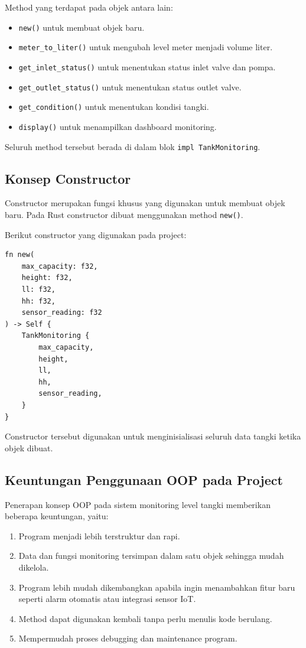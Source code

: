 \documentclass[12pt,a4paper]{article}
\begin{document}
Method yang terdapat pada objek antara lain:

\begin{itemize}
    \item \texttt{new()} untuk membuat objek baru.
    \item \texttt{meter\_to\_liter()} untuk mengubah level meter menjadi volume liter.
    \item \texttt{get\_inlet\_status()} untuk menentukan status inlet valve dan pompa.
    \item \texttt{get\_outlet\_status()} untuk menentukan status outlet valve.
    \item \texttt{get\_condition()} untuk menentukan kondisi tangki.
    \item \texttt{display()} untuk menampilkan dashboard monitoring.
\end{itemize}

Seluruh method tersebut berada di dalam blok \texttt{impl TankMonitoring}. 

\subsection{Konsep Constructor}

Constructor merupakan fungsi khusus yang digunakan untuk membuat objek baru. Pada Rust constructor dibuat menggunakan method \texttt{new()}.

Berikut constructor yang digunakan pada project:

\begin{verbatim}
fn new(
    max_capacity: f32,
    height: f32,
    ll: f32,
    hh: f32,
    sensor_reading: f32
) -> Self {
    TankMonitoring {
        max_capacity,
        height,
        ll,
        hh,
        sensor_reading,
    }
}
\end{verbatim}

Constructor tersebut digunakan untuk menginisialisasi seluruh data tangki ketika objek dibuat. 

\subsection{Keuntungan Penggunaan OOP pada Project}

Penerapan konsep OOP pada sistem monitoring level tangki memberikan beberapa keuntungan, yaitu:

\begin{enumerate}
    \item Program menjadi lebih terstruktur dan rapi.
    
    \item Data dan fungsi monitoring tersimpan dalam satu objek sehingga mudah dikelola.
    
    \item Program lebih mudah dikembangkan apabila ingin menambahkan fitur baru seperti alarm otomatis atau integrasi sensor IoT.
    
    \item Method dapat digunakan kembali tanpa perlu menulis kode berulang.
    
    \item Mempermudah proses debugging dan maintenance program.
\end{enumerate}
\end{document}
